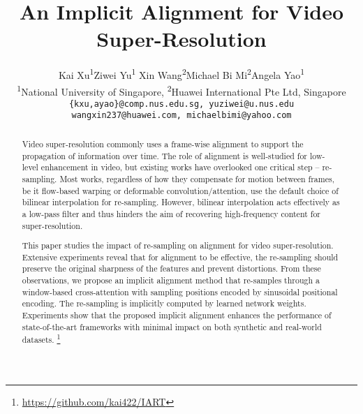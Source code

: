 \documentclass[10pt,twocolumn,letterpaper]{article}
\begin{document}
\title{An Implicit Alignment for Video Super-Resolution}

\author{
Kai Xu\textsuperscript{1}\qquad Ziwei Yu\textsuperscript{1} \qquad  Xin Wang\textsuperscript{2}\qquad Michael Bi Mi\textsuperscript{2}\qquad Angela Yao\textsuperscript{1}\\
\textsuperscript{1}National University of Singapore, \textsuperscript{2}Huawei International Pte Ltd, Singapore\\
{\small\texttt{\{kxu,ayao\}@comp.nus.edu.sg, yuziwei@u.nus.edu}}\\
{\small\texttt{wangxin237@huawei.com, michaelbimi@yahoo.com}}
}

\maketitle


\begin{abstract}
    Video super-resolution commonly uses a frame-wise alignment to support the propagation of information over time.  The role of alignment is well-studied for low-level enhancement in video, but existing works have overlooked one critical step -- re-sampling.
    Most works, regardless of how they compensate for motion between frames, be it flow-based warping or deformable convolution/attention, use the default choice of bilinear interpolation for re-sampling.  However, bilinear interpolation acts effectively as a low-pass filter and thus hinders the aim of recovering high-frequency content for super-resolution.  
   
   This paper studies the impact of re-sampling on alignment for video super-resolution.  Extensive experiments reveal that for alignment to be effective, the re-sampling should preserve the original sharpness of the features and prevent distortions. From these observations, we propose an implicit alignment method that re-samples through a window-based cross-attention with sampling positions encoded by sinusoidal positional encoding.  The re-sampling is implicitly computed by learned network weights. Experiments show that the proposed implicit alignment enhances the performance of state-of-the-art frameworks with minimal impact on both synthetic and real-world datasets. \footnote{\url{https://github.com/kai422/IART}}    
\end{abstract}
\end{document}
